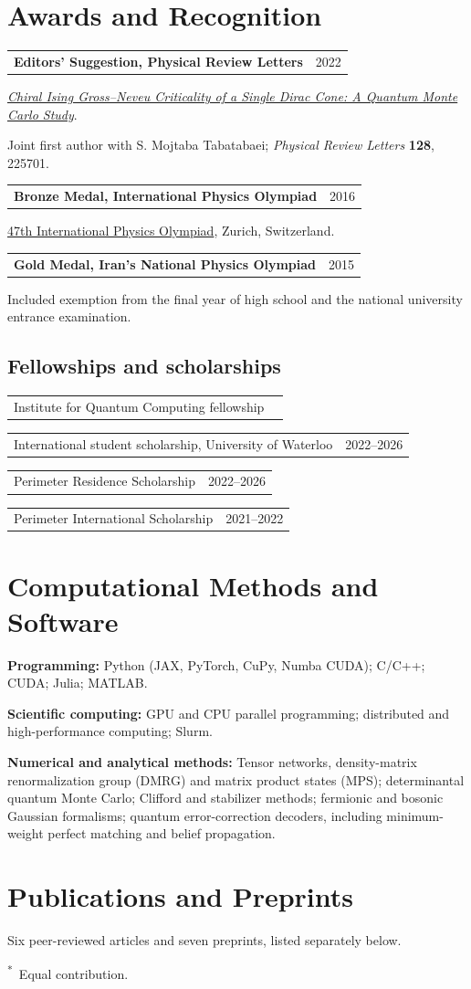 \documentclass[10pt,letterpaper]{article}
\makeatletter
\newcommand{\dated}[2]{\par\begin{tabularx}{\linewidth}{@{}>{\raggedright\arraybackslash}X@{\hspace{12pt}}r@{}}#1 & \textcolor{muted}{#2}\\\end{tabularx}\par}
\newcommand{\entry}[3]{\needspace{46pt}\dated{\textbf{#1}}{#2}#3\par\vspace{3pt}}
\newcommand{\equal}{\textsuperscript{*}}
\newcommand{\topic}[2]{\needspace{40pt}\textbf{#1:} #2\par\vspace{3pt}}
\makeatother
\begin{document}
\section{Awards and Recognition}
\entry{Editors' Suggestion, Physical Review Letters}{2022}{
\href{https://doi.org/10.1103/PhysRevLett.128.225701}{\textit{Chiral Ising Gross--Neveu Criticality of a Single Dirac Cone: A Quantum Monte Carlo Study}}.\par
Joint first author with S. Mojtaba Tabatabaei; \textit{Physical Review Letters} \textbf{128}, 225701.}
\entry{Bronze Medal, International Physics Olympiad}{2016}{
\href{https://science.olympiad.ch/fileadmin/user_upload/International_Olympiads_in_Switzerland/IPhO_2016/final_ranking.pdf}{47th International Physics Olympiad}, Zurich, Switzerland.}
\entry{Gold Medal, Iran's National Physics Olympiad}{2015}{
Included exemption from the final year of high school and the national university entrance examination.}
\subsection{Fellowships and scholarships}
\dated{Institute for Quantum Computing fellowship}{}
\dated{International student scholarship, University of Waterloo}{2022--2026}
\dated{Perimeter Residence Scholarship}{2022--2026}
\dated{Perimeter International Scholarship}{2021--2022}

\Needspace{70pt}
\section{Computational Methods and Software}
\topic{Programming}{
Python (JAX, PyTorch, CuPy, Numba CUDA); C/C++; CUDA; Julia; MATLAB.}
\topic{Scientific computing}{
GPU and CPU parallel programming; distributed and high-performance computing; Slurm.}
\topic{Numerical and analytical methods}{
Tensor networks, density-matrix renormalization group (DMRG) and matrix product states (MPS); determinantal quantum Monte Carlo; Clifford and stabilizer methods; fermionic and bosonic Gaussian formalisms; quantum error-correction decoders, including minimum-weight perfect matching and belief propagation.}

\section{Publications and Preprints}
Six peer-reviewed articles and seven preprints, listed separately below.\par
{\small\color{muted}\equal\ Equal contribution.}
\end{document}
